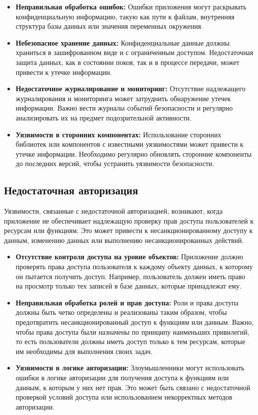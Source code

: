 \documentclass[a4paper,12pt]{diplom}
\begin{document}
	 \begin{itemize}
	 	\item \textbf{Неправильная обработка ошибок:}  Ошибки приложения могут раскрывать конфиденциальную информацию, такую как пути к файлам, внутренняя структура базы данных или значения переменных окружения.
	 	\item \textbf{Небезопасное хранение данных:}  Конфиденциальные данные должны храниться в зашифрованном виде и с ограниченным доступом. Недостаточная защита данных, как в состоянии покоя, так и в процессе передачи, может привести к утечке информации.
	 	\item \textbf{Недостаточное журналирование и мониторинг:}  Отсутствие надлежащего журналирования и мониторинга может затруднить обнаружение утечек информации. Важно вести журналы событий безопасности и регулярно анализировать их на предмет подозрительной активности.
	 	\item \textbf{Уязвимости в сторонних компонентах:}  Использование сторонних библиотек или компонентов с известными уязвимостями может привести к утечке информации. Необходимо регулярно обновлять сторонние компоненты до последних версий, чтобы устранить уязвимости безопасности.
	 \end{itemize}
	 
	 \subsection{Недостаточная авторизация}
	 
	 Уязвимости, связанные с недостаточной авторизацией, возникают, когда приложение не обеспечивает надлежащую проверку прав доступа пользователей к ресурсам или функциям. Это может привести к несанкционированному доступу к данным, изменению данных или выполнению несанкционированных действий. 
	 
	 \begin{itemize}
	 	\item \textbf{Отсутствие контроля доступа на уровне объектов:}  Приложение должно проверять права доступа пользователя к каждому объекту данных, к которому он пытается получить доступ.  Например, пользователь должен иметь право на просмотр только тех записей в базе данных, которые принадлежат ему.
	 	\item \textbf{Неправильная обработка ролей и прав доступа:}  Роли и права доступа должны быть четко определены и реализованы таким образом, чтобы предотвратить несанкционированный доступ к функциям или данным.  Важно, чтобы права доступа были назначены по принципу наименьших привилегий, то есть пользователи должны иметь доступ только к тем ресурсам, которые им необходимы для выполнения своих задач.
	 	\item \textbf{Уязвимости в логике авторизации:}  Злоумышленники могут использовать ошибки в логике авторизации для получения доступа к функциям или данным, к которым у них нет прав.  Это может быть связано с недостаточной проверкой условий доступа или использованием некорректных методов авторизации.
	 \end{itemize}
	 
\end{document}
